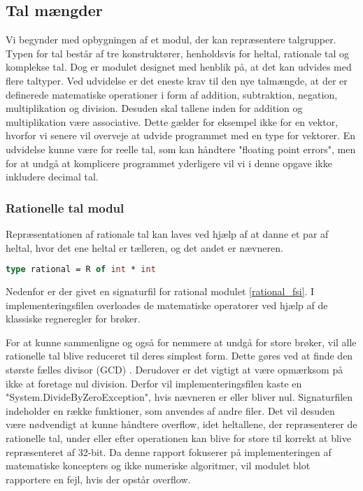 \documentclass{article}
\begin{document}
\subsection{Tal mængder}
Vi begynder med opbygningen af et modul, der kan repræsentere talgrupper. Typen for tal består af tre konstruktører, henholdsvis for heltal, rationale tal og komplekse tal. Dog er modulet designet med henblik på, at det kan udvides med flere taltyper. Ved udvidelse er det eneste krav til den nye talmængde, at der er definerede matematiske operationer i form af addition, subtraktion, negation, multiplikation og division. Desuden skal tallene inden for addition og multiplikation være associative. Dette gælder for eksempel ikke for en vektor, hvorfor vi senere vil overveje at udvide programmet med en type for vektorer. En udvidelse kunne være for reelle tal, som kan håndtere "floating point errors", men for at undgå at komplicere programmet yderligere vil vi i denne opgave ikke inkludere decimal tal.

\subsubsection{Rationelle tal modul}
Repræsentationen af rationale tal kan laves ved hjælp af at danne et par af heltal, hvor det ene heltal er tælleren, og det andet er nævneren.


\begin{lstlisting}[language={FSharp}, 
    label={type_rationel},
    caption={Typen for rationelle tal}]
type rational = R of int * int
\end{lstlisting}
Nedenfor er der givet en signaturfil for rational modulet \ref{rational_fsi}. I implementeringsfilen overloades de matematiske operatorer ved hjælp af de klassiske regneregler for brøker.


For at kunne sammenligne og også for nemmere at undgå for store brøker, vil alle rationelle tal blive reduceret til deres simplest form. Dette gøres ved at finde den største fælles divisor (GCD) . Derudover er det vigtigt at være opmærksom på ikke at foretage nul division. Derfor vil implementeringsfilen kaste en "System.DivideByZeroException", hvis nævneren er eller bliver nul. Signaturfilen indeholder en række funktioner, som anvendes af andre filer. Det vil desuden være nødvendigt at kunne håndtere overflow, idet heltallene, der repræsenterer de rationelle tal, under eller efter operationen kan blive for store til korrekt at blive repræsenteret af 32-bit. Da denne rapport fokuserer på implementeringen af matematiske koncepters og ikke numeriske algoritmer, vil modulet blot rapportere en fejl, hvis der opstår overflow.
 
\end{document}
